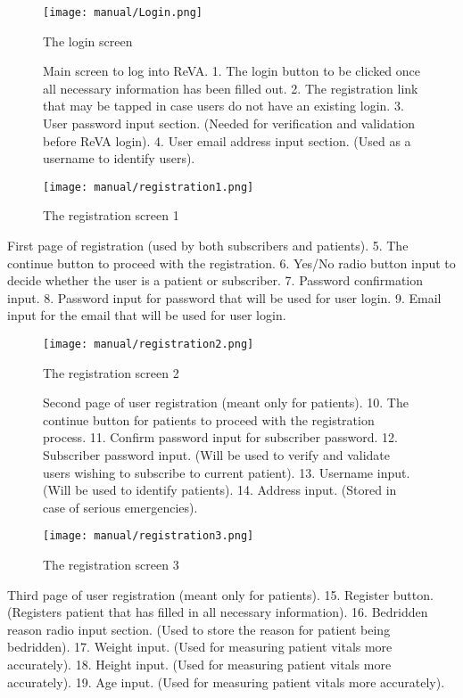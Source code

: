 \begin{figure}[ht!]
\centering
\begin{minipage}{.5\textwidth}
  \centering
  \texttt{[image: manual/Login.png]}
  \caption{\label{fig:vitals}The login screen}
Main screen to log into ReVA. 
   1. The login button to be clicked once all necessary information has been filled out. 
   2. The registration link that may be tapped in case users do not have an existing login. 
   3. User password input section. (Needed for verification and validation before ReVA login). 
   4. User email address input section. (Used as a username to identify users). 
\end{minipage}%
\begin{minipage}{.5\textwidth}
  \centering
  \texttt{[image: manual/registration1.png]}
  \caption{\label{fig:statistic}The registration screen 1}
\end{minipage}
\end{figure}
First page of registration (used by both subscribers and patients). 
  5. The continue button to proceed with the registration. 
  6. Yes/No radio button input to decide whether the user is a patient or subscriber. 
  7. Password confirmation input. 
  8. Password input for password that will be used for user login. 
  9. Email input for the email that will be used for user login. 

\begin{figure}[ht!]
\centering
\begin{minipage}{.5\textwidth}
  \centering
  \texttt{[image: manual/registration2.png]}
  \caption{\label{fig:vitals}The registration screen 2}
Second page of user registration (meant only for patients). 
  10. The continue button for patients to proceed with the registration process. 
  11. Confirm password input for subscriber password. 
  12. Subscriber password input. (Will be used to verify and validate users wishing to subscribe to current patient). 
  13. Username input. (Will be used to identify patients). 
  14. Address input. (Stored in case of serious emergencies). 

\end{minipage}%
\begin{minipage}{.5\textwidth}
  \centering
  \texttt{[image: manual/registration3.png]}
  \caption{\label{fig:statistic}The registration screen 3}
\end{minipage}
\end{figure}
Third page of user registration (meant only for patients). 
  15. Register button. (Registers patient that has filled in all necessary information). 
  16. Bedridden reason radio input section. (Used to store the reason for patient being bedridden). 
  17. Weight input. (Used for measuring patient vitals more accurately). 
  18. Height input. (Used for measuring patient vitals more accurately). 
  19. Age input. (Used for measuring patient vitals more accurately). 


